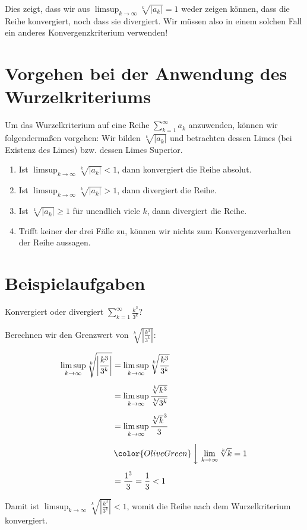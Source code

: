 \documentclass[fontsize=9pt,
               parskip=half-,
               DIV=14,
               listof=chapterentry,
               tocflat]{scrbook}
\begin{document}
Dies zeigt, dass wir aus $\limsup _{k\to \infty }{\sqrt[{k}]{|a_{k}|}}=1$ weder zeigen können, dass die Reihe konvergiert, noch dass sie divergiert. Wir müssen also in einem solchen Fall ein anderes Konvergenzkriterium verwenden!

\section{Vorgehen bei der Anwendung des Wurzelkriteriums}

Um das Wurzelkriterium auf eine Reihe $\sum _{k=1}^{\infty }a_{k}$ anzuwenden, können wir folgendermaßen vorgehen: Wir bilden ${\sqrt[{k}]{|a_{k}|}}$ und betrachten dessen Limes (bei Existenz des Limes) bzw. dessen Limes Superior.

\begin{enumerate}
\item Ist $\limsup _{k\to \infty }{\sqrt[{k}]{|a_{k}|}}<1$, dann konvergiert die Reihe absolut.
\item Ist $\limsup _{k\to \infty }{\sqrt[{k}]{|a_{k}|}}>1$, dann divergiert die Reihe.
\item Ist ${\sqrt[{k}]{|a_{k}|}}\geq 1$ für unendlich viele $k$, dann divergiert die Reihe.
\item Trifft keiner der drei Fälle zu, können wir nichts zum Konvergenzverhalten der Reihe aussagen.
\end{enumerate}

\section{Beispielaufgaben}

\begin{exercise*}
Konvergiert oder divergiert $\sum _{k=1}^{\infty }{\frac {k^{3}}{3^{k}}}$?

\end{exercise*}

\begin{solution*}
Berechnen wir den Grenzwert von ${\sqrt[{k}]{\left|{\tfrac {k^{3}}{3^{k}}}\right|}}$:

\begin{align*}
\limsup _{k\to \infty }{\sqrt[{k}]{\left|{\frac {k^{3}}{3^{k}}}\right|}}&=\limsup _{k\to \infty }{\sqrt[{k}]{\frac {k^{3}}{3^{k}}}}\\[0.5em]&=\limsup _{k\to \infty }{\frac {\sqrt[{k}]{k^{3}}}{\sqrt[{k}]{3^{k}}}}\\[0.5em]&=\limsup _{k\to \infty }{\frac {{\sqrt[{k}]{k}}^{3}}{3}}\\[0.5em]&\,{\color {OliveGreen}\left\downarrow \ \lim _{k\to \infty }{\sqrt[{k}]{k}}=1\right.}\\[0.5em]&={\frac {1^{3}}{3}}={\frac {1}{3}}<1
\end{align*}

Damit ist $\limsup _{k\to \infty }{\sqrt[{k}]{\left|{\tfrac {k^{3}}{3^{k}}}\right|}}<1$, womit die Reihe nach dem Wurzelkriterium konvergiert.

\end{solution*}
\end{document}
